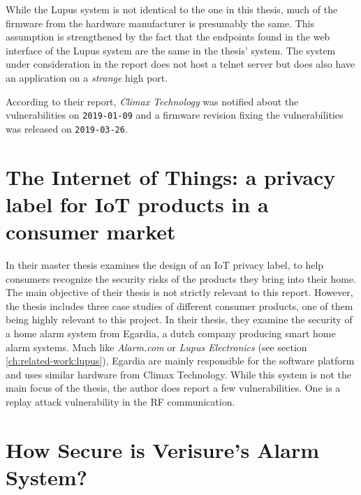 While the Lupus system is not identical to the one in this thesis, much of the firmware from the hardware manufacturer is presumably the same. This assumption is strengthened by the fact that the endpoints found in the web interface of the Lupus system are the same in the thesis' system. The system under consideration in the report does not host a telnet server but does also have an application on a \textit{strange} high port.

According to their report, \textit{Climax Technology} was notified about the vulnerabilities on \texttt{2019-01-09} and a firmware revision fixing the vulnerabilities was released on \texttt{2019-03-26}.

\section{The Internet of Things: a privacy label for IoT products in a consumer market}
In their master thesis \citeauthor{iotprivacylabel} examines the design of an IoT privacy label, to help consumers recognize the security risks of the products they bring into their home. The main objective of their thesis is not strictly relevant to this report. However, the thesis includes three case studies of different consumer products, one of them being highly relevant to this project. In their thesis, they examine the security of a home alarm system from Egardia, a dutch company producing smart home alarm systems. Much like \textit{Alarm.com} or \textit{Lupus Electronics} (see section \ref{ch:related-work:lupus}), Egardia are mainly responsible for the software platform and uses similar hardware from Climax Technology. While this system is not the main focus of the thesis, the author does report a few vulnerabilities. One is a replay attack vulnerability in the \gls{RF} communication.

\section{How Secure is Verisure’s Alarm System?}
\todo \cite{verisurethesis}
